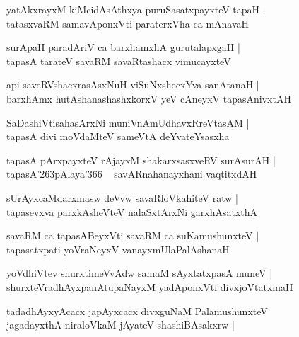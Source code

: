 \documentclass[twoside,12pt,openright]{book}
\def\S{\char'263}
\newcounter{shloka}[chapter]
\begin{document}
\begin{shloka}%
yatAkxrayxM kiMcidAsAthxya puruSasatxpayxteV tapaH |\\
tatasxvaRM samavAponxVti paraterxVha ca mAnavaH 
\end{shloka}

\begin{shloka}%
surApaH paradAriV ca barxhamxhA gurutalapxgaH |\\
tapasA tarateV savaRM savaRtashacx vimucayxteV
\end{shloka}

\begin{shloka}%
api saveRVshacxrasAsxNuH viSuNxshecxYva sanAtanaH |\\
barxhAmx hutAshanashashxkorxV yeV cAneyxV tapasAnivxtAH
\end{shloka}

\begin{shloka}%
SaDashiVtisahasArxNi muniVnAmUdhavxRreVtasAM |\\
tapasA divi moVdaMteV sameVtA deYvateYsasxha 
\end{shloka}

\begin{shloka}%
tapasA pArxpayxteV rAjayxM shakarxsasxveRV surAsurAH |\\
tapasA\S pAlaya\char'366 ~ savARnahanayxhani vaqtitxdAH
\end{shloka}

\begin{shloka}%
sUrAyxcaMdarxmasw deVvw savaRloVkahiteV ratw |\\
tapasevxva parxkAsheVteV nalaSxtArxNi garxhAsatxthA 
\end{shloka}

\begin{shloka}%
savaRM ca tapasABeyxVti savaRM ca suKamushunxteV |\\
tapasatxpati yoVraNeyxV vanayxmUlaPalAshanaH
\end{shloka}

\begin{shloka}%
yoVdhiVtev shurxtimeVvAdw samaM sAyxtatxpasA muneV |\\
shurxteVradhAyxpanAtupaNayxM yadAponxVti divxjoVtatxmaH
\end{shloka}

\begin{shloka}%
tadadhAyxyAcacx japAyxcacx divxguNaM PalamushunxteV \\
jagadayxthA niraloVkaM jAyateV shashiBAsakxrw |\\
\end{shloka}
\end{document}
